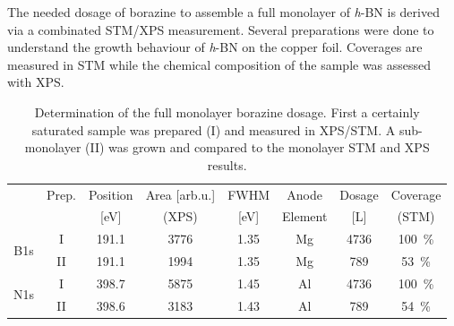 The needed dosage of borazine to assemble a full monolayer of \textit{h}-BN is derived via a combinated STM/XPS measurement. Several preparations were done to understand the growth behaviour of \textit{h}-BN on the copper foil. Coverages are measured in STM while the chemical composition of the sample was assessed with XPS.
\begin{table}[h!]
	\centering
	\caption{Determination of the full monolayer borazine dosage. First a certainly saturated sample was prepared (I) and measured in XPS/STM. A sub-monolayer (II) was grown and compared to the monolayer STM and XPS results.}
	\begin{tabular}{cccccccc}
		& Prep. & Position    & Area [arb.u.] & FWHM  & Anode & Dosage  & Coverage\\ 
		&	  &	[eV]	& (XPS)		&[eV]	&Element&[L]	  & (STM) \\ \hline \hline
		\multirow{2}{*}{B1s} 	&I& 191.1 & 3776 & 1.35 & Mg & 4736 & \SI{100}{\percent}\\
		&II& 191.1 & 1994 & 1.35 & Mg & 789 &\SI{53}{\percent}\\ \hline
		\multirow{2}{*}{N1s} 	&I& 398.7 & 5875 & 1.45 & Al  & 4736 & \SI{100}{\percent}\\
		&II& 398.6 & 3183 & 1.43 & Al & 789 &\SI{54}{\percent}\\
	\end{tabular}
\end{table}

